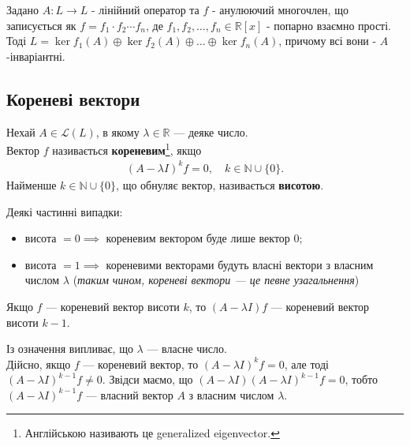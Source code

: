 \documentclass{math_library}
\begin{document}
\begin{corollary}
Задано $A: L \to L$ - лінійний оператор та $f$ - анулюючий многочлен, що записується як $f = f_1 \cdot f_2 \cdots f_n$, де $f_1,f_2,\dots,f_n \in \mathbb{R}[x]$ - попарно взаємно прості.\\
Тоді $L = \ker f_1(A)  \oplus  \ker f_2(A)  \oplus  \dots  \oplus  \ker f_n(A)$, причому всі вони - $A$-інваріантні.
\end{corollary}
\fi

\subsection{Кореневі вектори}
\begin{definition}
Нехай $A \in \mathcal{L}(L)$, в якому $\lambda \in \mathbb{R}$ --- деяке число.\\
Вектор $f$ називається \textbf{кореневим}\footnote{Англійською називають це generalized eigenvector.}, якщо
\begin{align*}
(A-\lambda I)^k f = 0,\quad k \in \mathbb{N} \cup \{0\}.
\end{align*}
Найменше $k \in \mathbb{N} \cup \{0\}$, що обнуляє вектор, називається \textbf{висотою}.
\end{definition}
\noindent

\begin{remark}
Деякі частинні випадки:
\begin{itemize}[nosep,wide=0pt,label={--}]
\item висота $= 0 \implies$ кореневим вектором буде лише вектор $0$;
\item висота $= 1 \implies$ кореневими векторами будуть власні вектори з власним числом $\lambda$ (\textit{таким чином, кореневі вектори --- це певне узагальнення})
\end{itemize}
\end{remark}

\begin{remark}
Якщо $f$ --- кореневий вектор висоти $k$, то $(A-\lambda I)f$ --- кореневий вектор висоти $k-1$.
\end{remark}

\begin{remark}
Із означення випливає, що $\lambda$ --- власне число. 
\bigskip \\
Дійсно, якщо $f$ --- кореневий вектор, то $(A-\lambda I)^k f = 0$, але тоді $(A-\lambda I)^{k-1} f \neq 0$. Звідси маємо, що $(A-\lambda I) (A-\lambda I)^{k-1} f = 0$, тобто $(A-\lambda I)^{k-1} f$ --- власний вектор $A$ з власним числом $\lambda$.
\end{remark}
\end{document}
